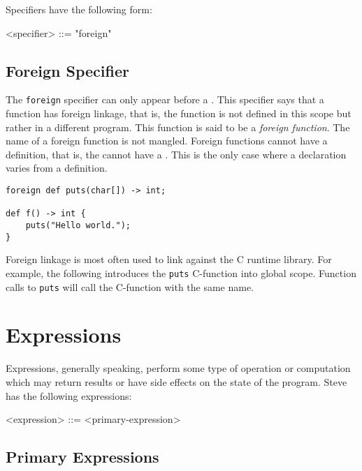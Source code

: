 Specifiers have the following form:

\begin{grammar}
\singlespace
<specifier> ::= "foreign"
\end{grammar}

\subsection{Foreign Specifier} \label{guide:foreign_spec}

The \texttt{foreign} specifier can only appear before a . This specifier says that a function has foreign linkage, that is, the function is not defined in this scope but rather in a different program. This function is said to be a \textit{foreign function}. The name of a foreign function is not mangled. Foreign functions cannot have a definition, that is, the  cannot have a . This is the only case where a declaration varies from a definition.

\begin{minip}
\begin{lstlisting}
foreign def puts(char[]) -> int;

def f() -> int {
	puts("Hello world.");
}
\end{lstlisting}
\end{minip}

Foreign linkage is most often used to link against the C runtime library. For example, the following introduces the \texttt{puts} C-function into global scope. Function calls to \texttt{puts} will call the C-function with the same name.

\section{Expressions} \label{guide:expr}

Expressions, generally speaking, perform some type of operation or computation which may return results or have side effects on the state of the program. Steve has the following expressions:

\begin{minip}
\begin{grammar}
<expression> ::=
<primary-expression>
\end{grammar}
\end{minip}

\subsection{Primary Expressions} \label{guide:primary_expr}

